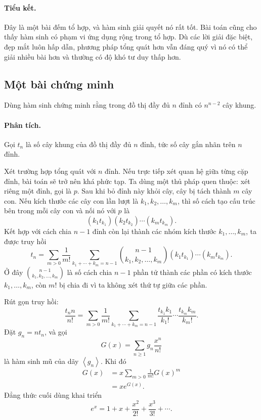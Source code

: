 \documentclass[11pt]{article}
\newcommand{\seq}[1]{\left\langle #1\right\rangle}
\newcommand{\C}[2]{\binom{#1}{#2}}
\begin{document}
\paragraph{Tiểu kết.}
Đây là một bài đếm tổ hợp, và hàm sinh giải quyết nó rất tốt. Bài toán cũng
cho thấy hàm sinh có phạm vi ứng dụng rộng trong tổ hợp. Dù các lời giải đặc
biệt, đẹp mắt luôn hấp dẫn, phương pháp tổng quát hơn vẫn đáng quý vì nó có
thể giải nhiều bài hơn và thường có độ khó tư duy thấp hơn.

\subsection{Một bài chứng minh}

Dùng hàm sinh chứng minh rằng trong đồ thị đầy đủ \(n\) đỉnh có
\(n^{n-2}\) cây khung.

\paragraph{Phân tích.}
Gọi \(t_n\) là số cây khung của đồ thị đầy đủ \(n\) đỉnh, tức số cây gắn nhãn
trên \(n\) đỉnh.

Xét trường hợp tổng quát với \(n\) đỉnh. Nếu trực tiếp xét quan hệ giữa từng
cặp đỉnh, bài toán sẽ trở nên khá phức tạp. Ta dùng một thủ pháp quen thuộc:
xét riêng một đỉnh, gọi là \(p\). Sau khi bỏ đỉnh này khỏi cây, cây bị tách
thành \(m\) cây con. Nếu kích thước các cây con lần lượt là
\(k_1,k_2,\ldots,k_m\), thì số cách tạo cấu trúc bên trong mỗi cây con và nối
nó với \(p\) là
\[
  (k_1t_{k_1})(k_2t_{k_2})\cdots(k_mt_{k_m}).
\]
Kết hợp với cách chia \(n-1\) đỉnh còn lại thành các nhóm kích thước
\(k_1,\ldots,k_m\), ta được truy hồi
\[
  t_n=\sum_{m>0}\frac1{m!}
  \sum_{k_1+\cdots+k_m=n-1}
  \C{n-1}{k_1,k_2,\ldots,k_m}
  (k_1t_{k_1})\cdots(k_mt_{k_m}).
\]
Ở đây \(\C{n-1}{k_1,k_2,\ldots,k_m}\) là số cách chia \(n-1\) phần tử thành
các phần có kích thước \(k_1,\ldots,k_m\), còn \(m!\) bị chia đi vì ta không
xét thứ tự giữa các phần.

Rút gọn truy hồi:
\[
  \frac{t_n n}{n!}
  =\sum_{m>0}\frac1{m!}
   \sum_{k_1+\cdots+k_m=n-1}
   \frac{t_{k_1}k_1}{k_1!}\cdots
   \frac{t_{k_m}k_m}{k_m!}.
\]
Đặt \(g_n=nt_n\), và gọi
\[
  G(x)=\sum_{n\ge1}g_n\frac{x^n}{n!}
\]
là hàm sinh mũ của dãy \(\seq{g_n}\). Khi đó
\[
\begin{aligned}
  G(x)
  &=x\sum_{m>0}\frac1{m!}G(x)^m\\
  &=x e^{G(x)}.
\end{aligned}
\]
Đẳng thức cuối dùng khai triển
\[
  e^x=1+x+\frac{x^2}{2!}+\frac{x^3}{3!}+\cdots.
\]
\end{document}

